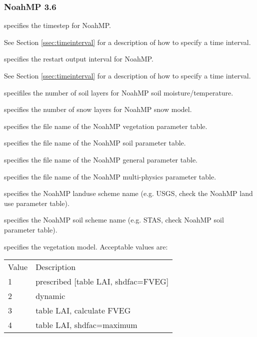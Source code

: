  
 \subsubsection{NoahMP 3.6} \label{sssec:lsm_noahmp36}
 

 
  specifies the timestep for NoahMP.

 See Section \ref{ssec:timeinterval} for a description
 of how to specify a time interval.

  specifies the restart output
 interval for NoahMP.

 See Section \ref{ssec:timeinterval} for a description
 of how to specify a time interval.

  specifiles the number of soil layers for NoahMP
 soil moisture/temperature.

  specifies the number of snow layers for NoahMP
 snow model.

  specifies the file name of the
 NoahMP vegetation parameter table.

  specifies the file name of the NoahMP
 soil parameter table.

  specifies the file name of the NoahMP
 general parameter table.

  specifies the file name of the NoahMP
 multi-physics parameter table.

  specifies the NoahMP landuse
 scheme name (e.g. USGS, check the NoahMP land use parameter table).

  specifies the NoahMP soil scheme
 name (e.g. STAS, check NoahMP soil parameter table).

  specifies the vegetation model.
 Acceptable values are:

 \begin{tabular}{ll}
 Value & Description                         \\
 1     & prescribed [table LAI, shdfac=FVEG] \\
 2     & dynamic                             \\
 3     & table LAI, calculate FVEG           \\
 4     & table LAI, shdfac=maximum           \\
 \end{tabular}

